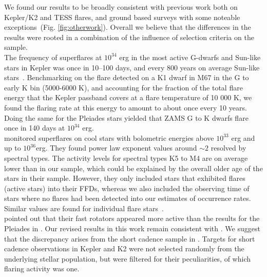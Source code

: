 \documentclass{aa}
\begin{document}
We found our results to be broadly consistent with previous work both on Kepler/K2 and TESS flares, and ground based surveys with some noteable exceptions~(Fig. \ref{fig:otherwork}). Overall we believe that the differences in the results were rooted in a combination of the influence of selection criteria on the sample. 
\\
The frequency of superflares at $10^{34}$ erg in the most active G-dwarfs and Sun-like stars in Kepler was once in 10–100 days, and every 800 years on average Sun-like stars~\citep{shibayama_2013}. Benchmarking on the flare detected on a K1 dwarf in M67 in the G to early K bin (5000-6000 K), and accounting for the fraction of the total flare energy that the Kepler passband covers at a flare temperature of 10 000 K, we found the flaring rate at this energy to amount to about once every 10 years. Doing the same for the Pleiades stars yielded that ZAMS G to K dwarfs flare once in 140 days at $10^{34}$ erg.
\\
\citet{howard2019} monitored superflares on cool stars with bolometric energies above $10^{33}$ erg and up to $10^{36}$erg. They found power law exponent values around $\sim 2$ resolved by spectral types. The activity levels for spectral types K5 to M4 are on average lower than in our sample, which could be explained by the overall older age of the stars in their sample. However, they only included stars that exhibited flares (active stars) into their FFDs, whereas we also included the observing time of stars where no flares had been detected into our estimates of occurrence rates. Similar values are found for individual flare stars~\citep{lurie_kepler_2015}.
\\
\citet{2020arXiv200311937R} pointed out that their fast rotators appeared more active than the results for the Pleiades in \citet{ilin_flares_2019}. Our revised results in this work remain consistent with \citet{ilin_flares_2019}. We suggest that the discrepancy arises from the short cadence sample in \citet{2020arXiv200311937R}. Targets for short cadence observations in Kepler and K2 were not selected randomly from the underlying stellar population, but were filtered for their peculiarities, of which flaring activity was one.
\end{document}
